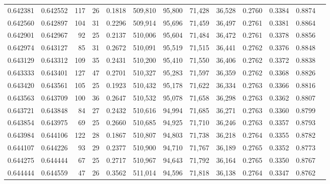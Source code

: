 \begin{tabular}{rrrrrrrrrrrrr}
0.642381 & 0.642552 &    117 &    26 &                                     0.1818 & 509,810 &  95,800 &  71,428 &  36,528 & 0.2760 & 0.3384 & 0.8874 \\
0.642560 & 0.642897 &    104 &    31 &                                     0.2296 & 509,914 &  95,696 &  71,459 &  36,497 & 0.2761 & 0.3381 & 0.8864 \\
0.642901 & 0.642967 &     92 &    25 &                                     0.2137 & 510,006 &  95,604 &  71,484 &  36,472 & 0.2761 & 0.3378 & 0.8856 \\
0.642974 & 0.643127 &     85 &    31 &                                     0.2672 & 510,091 &  95,519 &  71,515 &  36,441 & 0.2762 & 0.3376 & 0.8848 \\
0.643129 & 0.643312 &    109 &    35 &                                     0.2431 & 510,200 &  95,410 &  71,550 &  36,406 & 0.2762 & 0.3372 & 0.8838 \\
0.643333 & 0.643401 &    127 &    47 &                                     0.2701 & 510,327 &  95,283 &  71,597 &  36,359 & 0.2762 & 0.3368 & 0.8826 \\
0.643420 & 0.643561 &    105 &    25 &                                     0.1923 & 510,432 &  95,178 &  71,622 &  36,334 & 0.2763 & 0.3366 & 0.8816 \\
0.643563 & 0.643709 &    100 &    36 &                                     0.2647 & 510,532 &  95,078 &  71,658 &  36,298 & 0.2763 & 0.3362 & 0.8807 \\
0.643721 & 0.643848 &     84 &    27 &                                     0.2432 & 510,616 &  94,994 &  71,685 &  36,271 & 0.2763 & 0.3360 & 0.8799 \\
0.643854 & 0.643975 &     69 &    25 &                                     0.2660 & 510,685 &  94,925 &  71,710 &  36,246 & 0.2763 & 0.3357 & 0.8793 \\
0.643984 & 0.644106 &    122 &    28 &                                     0.1867 & 510,807 &  94,803 &  71,738 &  36,218 & 0.2764 & 0.3355 & 0.8782 \\
0.644107 & 0.644226 &     93 &    29 &                                     0.2377 & 510,900 &  94,710 &  71,767 &  36,189 & 0.2765 & 0.3352 & 0.8773 \\
0.644275 & 0.644444 &     67 &    25 &                                     0.2717 & 510,967 &  94,643 &  71,792 &  36,164 & 0.2765 & 0.3350 & 0.8767 \\
0.644444 & 0.644559 &     47 &    26 &                                     0.3562 & 511,014 &  94,596 &  71,818 &  36,138 & 0.2764 & 0.3347 & 0.8762 \\

\end{tabular}
